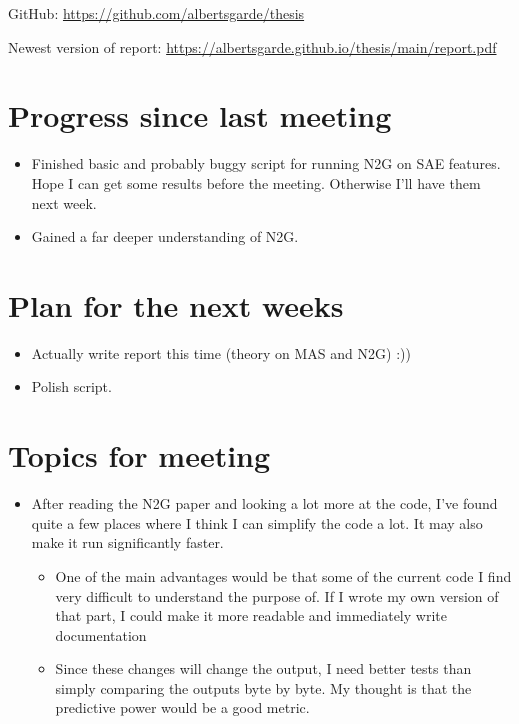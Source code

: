 \documentclass[main.tex]{subfiles}
\begin{document}
GitHub: \url{https://github.com/albertsgarde/thesis}

Newest version of report: \url{https://albertsgarde.github.io/thesis/main/report.pdf}


\section*{Progress since last meeting}
\begin{itemize}
    \item Finished basic and probably buggy script for running N2G on SAE features. Hope I can get some results before the meeting. Otherwise I'll have them next week.
    \item Gained a far deeper understanding of N2G.
\end{itemize}
\section*{Plan for the next weeks}
\begin{itemize}
    \item Actually write report this time (theory on MAS and N2G) :))
    \item Polish script.
\end{itemize}
\section*{Topics for meeting}
\begin{itemize}
    \item After reading the N2G paper and looking a lot more at the code, I've found quite a few places where I think I can simplify the code a lot. It may also make it run significantly faster.
    \begin{itemize}
        \item One of the main advantages would be that some of the current code I find very difficult to understand the purpose of. If I wrote my own version of that part, I could make it more readable and immediately write documentation
        \item Since these changes will change the output, I need better tests than simply comparing the outputs byte by byte. My thought is that the predictive power would be a good metric.
    \end{itemize}
\end{itemize}
\end{document}
